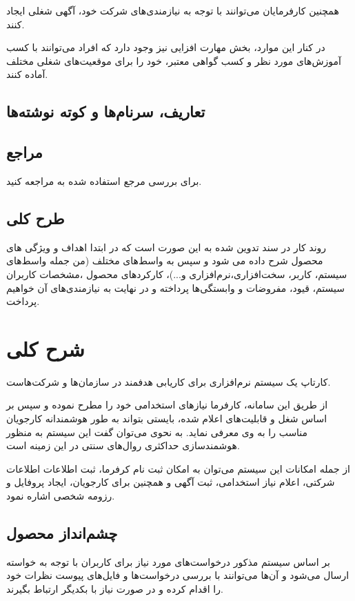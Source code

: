 \documentclass{report}
\begin{document}
				همچنین کارفرمایان می‌توانند با توجه به نیازمندی‌های شرکت خود، آگهی شغلی ایجاد کنند.
				
				در کنار این موارد، بخش مهارت افزایی نیز وجود دارد که افراد می‌توانند با کسب آموزش‌های مورد نظر و کسب گواهی معتبر، خود را برای موقعیت‌های شغلی مختلف آماده کنند.

			\subsection{تعاریف، سرنام‌ها و کوته نوشته‌ها}
			\subsection{مراجع}
				برای بررسی مرجع استفاده شده به 
				\cite{kung2013object}
				مراجعه کنید.
			\subsection{طرح کلی}
				روند کار در سند تدوین شده به این صورت است که در ابتدا اهداف و ویژگی های محصول شرح داده می شود و سپس به واسط‌های مختلف (من جمله واسط‌های سیستم، کاربر، سخت‌افزاری،نرم‌افزاری و...)، کارکردهای محصول ،مشخصات کاربران سیستم، قیود، مفروضات و وابستگی‌ها پرداخته و در نهایت به نیازمندی‌های آن خواهیم پرداخت.  
				
		\section{شرح کلی}
			کارتاپ یک سیستم نرم‌افزاری برای کاریابی هدفمند در سازمان‌ها و شرکت‌هاست.
			
			از طریق این سامانه، کارفرما نیاز‌های استخدامی خود را مطرح نموده و سپس بر اساس شغل و قابلیت‌های اعلام شده، بایستی بتواند به طور هوشمندانه کارجویان مناسب را به وی معرفی نماید. به نحوی می‌توان گفت این سیستم به منظور هوشمندسازی حداکثری روال‌های سنتی در این زمینه است.
			
			از جمله امکانات این سیستم می‌توان به امکان ثبت نام کرفرما، ثبت اطلاعات اطلاعات شرکتی، اعلام نیاز استخدامی، ثبت آگهی و همچنین برای کارجویان، ایجاد پروفایل و رزومه شخصی اشاره نمود.
			
			\subsection{چشم‌انداز محصول}
				بر اساس سیستم مذکور درخواست‌های مورد نیاز برای کاربران با توجه به خواسته ارسال می‌شود و آن‌ها می‌توانند با بررسی درخواست‌ها و فایل‌های پیوست نظرات خود را اقدام کرده و در صورت نیاز با بکدیگر ارتباط بگیرند.
				
\end{document}
